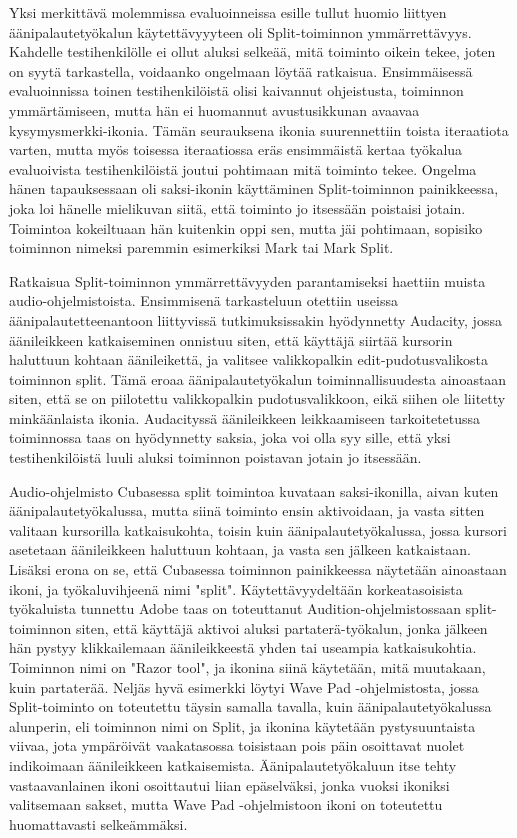 \documentclass[utf8]{gradu3}
\begin{document}
Yksi merkittävä molemmissa evaluoinneissa esille tullut huomio liittyen äänipalautetyökalun käytettävyyyteen oli Split-toiminnon ymmärrettävyys. Kahdelle testihenkilölle ei ollut aluksi selkeää, mitä toiminto oikein tekee, joten on syytä tarkastella, voidaanko ongelmaan löytää ratkaisua. Ensimmäisessä evaluoinnissa toinen testihenkilöistä olisi kaivannut ohjeistusta, toiminnon ymmärtämiseen, mutta hän ei huomannut avustusikkunan avaavaa kysymysmerkki-ikonia. Tämän seurauksena ikonia suurennettiin toista iteraatiota varten, mutta myös toisessa iteraatiossa eräs ensimmäistä kertaa työkalua evaluoivista testihenkilöistä joutui pohtimaan mitä toiminto tekee. Ongelma hänen tapauksessaan oli saksi-ikonin käyttäminen Split-toiminnon painikkeessa, joka loi hänelle mielikuvan siitä, että toiminto jo itsessään poistaisi jotain. Toimintoa kokeiltuaan hän kuitenkin oppi sen, mutta jäi pohtimaan, sopisiko toiminnon nimeksi paremmin esimerkiksi Mark tai Mark Split. 

Ratkaisua Split-toiminnon ymmärrettävyyden parantamiseksi haettiin muista audio-ohjelmistoista. Ensimmisenä tarkasteluun otettiin useissa äänipalautetteenantoon liittyvissä tutkimuksissakin hyödynnetty Audacity, jossa äänileikkeen katkaiseminen onnistuu siten, että käyttäjä siirtää kursorin haluttuun kohtaan äänileikettä, ja valitsee valikkopalkin edit-pudotusvalikosta toiminnon split. Tämä eroaa äänipalautetyökalun toiminnallisuudesta ainoastaan siten, että se on piilotettu valikkopalkin pudotusvalikkoon, eikä siihen ole liitetty minkäänlaista ikonia. Audacityssä äänileikkeen leikkaamiseen tarkoitetetussa toiminnossa taas on hyödynnetty saksia, joka voi olla syy sille, että yksi testihenkilöistä luuli aluksi toiminnon poistavan jotain jo itsessään.  

Audio-ohjelmisto Cubasessa split toimintoa kuvataan saksi-ikonilla, aivan kuten äänipalautetyökalussa, mutta siinä toiminto ensin aktivoidaan, ja vasta sitten valitaan kursorilla katkaisukohta, toisin kuin äänipalautetyökalussa, jossa kursori asetetaan äänileikkeen haluttuun kohtaan, ja vasta sen jälkeen katkaistaan. Lisäksi erona on se, että Cubasessa toiminnon painikkeessa näytetään ainoastaan ikoni, ja työkaluvihjeenä nimi "split". Käytettävyydeltään korkeatasoisista työkaluista tunnettu Adobe taas on toteuttanut Audition-ohjelmistossaan split-toiminnon siten, että käyttäjä aktivoi aluksi partaterä-työkalun, jonka jälkeen hän pystyy klikkailemaan äänileikkeestä yhden tai useampia katkaisukohtia. Toiminnon nimi on "Razor tool", ja ikonina siinä käytetään, mitä muutakaan, kuin partaterää. Neljäs hyvä esimerkki löytyi Wave Pad -ohjelmistosta, jossa Split-toiminto on toteutettu täysin samalla tavalla, kuin äänipalautetyökalussa alunperin, eli toiminnon nimi on Split, ja ikonina käytetään pystysuuntaista viivaa, jota ympäröivät vaakatasossa toisistaan pois päin osoittavat nuolet indikoimaan äänileikkeen katkaisemista. Äänipalautetyökaluun itse tehty vastaavanlainen ikoni osoittautui liian epäselväksi, jonka vuoksi ikoniksi valitsemaan sakset, mutta Wave Pad -ohjelmistoon ikoni on toteutettu huomattavasti selkeämmäksi. 
\end{document}
